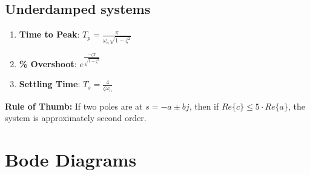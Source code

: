 \subsection*{Underdamped systems}
\begin{enumerate}
  \item[] \textbf{Time to Peak}: $T_p = \frac{\pi}{\omega_n\sqrt{1-\zeta^2}}$
  \item[] \textbf{\% Overshoot}: $e^{\frac{-\zeta\pi}{\sqrt{1-\zeta^2}}}$
  \item[] \textbf{Settling Time}: $T_s = \frac{4}{\zeta\omega_n}$
\end{enumerate}
\textbf{Rule of Thumb:} If two poles are at $s = -a\pm bj$, then if $Re\{c\} \leq 5\cdot Re\{a\}$, the system is approximately second order.
\clearpage
\clearpage
\section*{Bode Diagrams}
